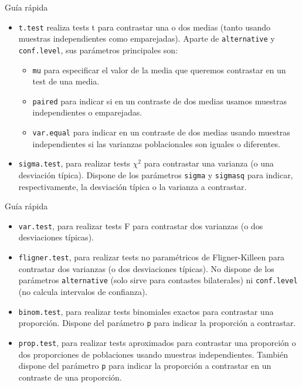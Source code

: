 \documentclass[
  ignorenonframetext,
]{beamer}
\begin{document}
\begin{frame}[fragile]{Guía rápida}
\protect\hypertarget{guuxeda-ruxe1pida-1}{}
\begin{itemize}[<+->]
\item
  \texttt{t.test} realiza tests t para contrastar una o dos medias
  (tanto usando muestras independientes como emparejadas). Aparte de
  \texttt{alternative} y \texttt{conf.level}, sus parámetros principales
  son:

  \begin{itemize}[<+->]
  \item
    \texttt{mu} para especificar el valor de la media que queremos
    contrastar en un test de una media.
  \item
    \texttt{paired} para indicar si en un contraste de dos medias usamos
    muestras independientes o emparejadas.
  \item
    \texttt{var.equal} para indicar en un contraste de dos medias usando
    muestras independientes si las varianzas poblacionales son iguales o
    diferentes.
  \end{itemize}
\item
  \texttt{sigma.test}, para realizar tests \(\chi^2\) para contrastar
  una varianza (o una desviación típica). Dispone de los parámetros
  \texttt{sigma} y \texttt{sigmasq} para indicar, respectivamente, la
  desviación típica o la varianza a contrastar.
\end{itemize}
\end{frame}

\begin{frame}[fragile]{Guía rápida}
\protect\hypertarget{guuxeda-ruxe1pida-2}{}
\begin{itemize}[<+->]
\item
  \texttt{var.test}, para realizar tests F para contrastar dos varianzas
  (o dos desviaciones típicas).
\item
  \texttt{fligner.test}, para realizar tests no paramétricos de
  Fligner-Killeen para contrastar dos varianzas (o dos desviaciones
  típicas). No dispone de los parámetros \texttt{alternative} (solo
  sirve para contastes bilaterales) ni \texttt{conf.level} (no calcula
  intervalos de confianza).
\item
  \texttt{binom.test}, para realizar tests binomiales exactos para
  contrastar una proporción. Dispone del parámetro \texttt{p} para
  indicar la proporción a contrastar.
\item
  \texttt{prop.test}, para realizar tests aproximados para contrastar
  una proporción o dos proporciones de poblaciones usando muestras
  independientes. También dispone del parámetro \texttt{p} para indicar
  la proporción a contrastar en un contraste de una proporción.
\end{itemize}
\end{frame}
\end{document}
